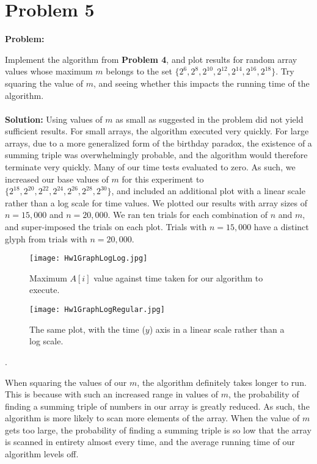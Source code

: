\documentclass[11pt]{article}
\begin{document}
\section*{Problem 5} 
{\bf Problem:}

Implement the algorithm from \textbf{Problem 4}, and plot results for random 
array values whose maximum $m$ belongs to the set
$\{2^{6},2^{8},2^{10},2^{12},2^{14},2^{16},2^{18}\}$. Try squaring the 
value of $m$, and seeing whether this impacts the running time of the
algorithm.\\
\\
{\bf Solution:}
Using values of $m$ as small as suggested in the problem did not yield 
sufficient results. For small arrays, the algorithm executed very quickly. 
For large arrays, due to a more generalized form of the birthday paradox,
the existence of a summing triple was overwhelmingly probable, and the
algorithm would therefore terminate very quickly. Many of our time tests
evaluated to zero. As such, we increased our base values of $m$ for this
experiment to $\{2^{18},2^{20},2^{22},2^{24},2^{26},2^{28},2^{30}\}$, and 
included an additional plot with a linear scale rather than a log scale for time values. 
We plotted our results with array sizes of $n = 15,000$ and $n = 20,000$. 
We ran ten trials for each combination of $n$ and $m$, and super-imposed the
trials on each plot. Trials with $n = 15,000$ have a distinct glyph from 
trials with $n = 20,000$. 

\begin{figure}[ht]
\begin{minipage}[b]{0.45\linewidth}
\centering
\texttt{[image: Hw1GraphLogLog.jpg]}
\caption{Maximum $A[i]$ value against time taken for our algorithm to execute.}
\label{fig:figure1}
\end{minipage}
\hspace{0.5cm}
\begin{minipage}[b]{0.45\linewidth}
\centering
\texttt{[image: Hw1GraphLogRegular.jpg]}
\caption{The same plot, with the time ($y$) axis in a linear scale rather than a log scale.}
\label{fig:figure2}
\end{minipage}
\end{figure}.

When squaring the values of our $m$, the algorithm definitely takes longer to 
run. This is because with such an increased range in values of $m$, the 
probability of finding a summing triple of numbers in our array is greatly
reduced. As such, the algorithm is more likely to scan more elements of the 
array. When the value of $m$ gets too large, the probability of finding a 
summing triple is so low that the array is scanned in entirety almost every
time, and the average running time of our algorithm levels off. 
\end{document}
